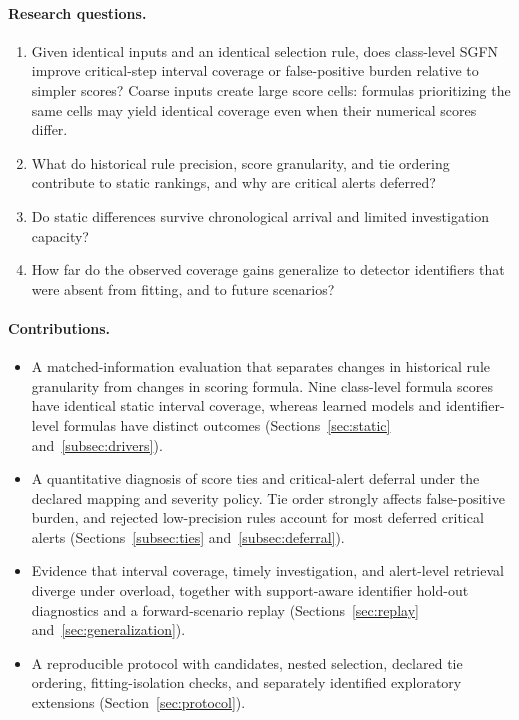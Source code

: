 \documentclass[pdflatex,sn-basic,Numbered]{sn-jnl}
\begin{document}
\paragraph{Research questions.}
\begin{enumerate}[label=RQ\arabic*,leftmargin=*]
\item Given identical inputs and an identical selection rule, does class-level SGFN improve critical-step interval coverage or false-positive burden relative to simpler scores? Coarse inputs create large score cells: formulas prioritizing the same cells may yield identical coverage even when their numerical scores differ.
\item What do historical rule precision, score granularity, and tie ordering contribute to static rankings, and why are critical alerts deferred?
\item Do static differences survive chronological arrival and limited investigation capacity?
\item How far do the observed coverage gains generalize to detector identifiers that were absent from fitting, and to future scenarios?
\end{enumerate}

\paragraph{Contributions.}
\begin{itemize}[leftmargin=*]
\item A matched-information evaluation that separates changes in historical rule granularity from changes in scoring formula. Nine class-level formula scores have identical static interval coverage, whereas learned models and identifier-level formulas have distinct outcomes (Sections~\ref{sec:static} and~\ref{subsec:drivers}).
\item A quantitative diagnosis of score ties and critical-alert deferral under the declared mapping and severity policy. Tie order strongly affects false-positive burden, and rejected low-precision rules account for most deferred critical alerts (Sections~\ref{subsec:ties} and~\ref{subsec:deferral}).
\item Evidence that interval coverage, timely investigation, and alert-level retrieval diverge under overload, together with support-aware identifier hold-out diagnostics and a forward-scenario replay (Sections~\ref{sec:replay} and~\ref{sec:generalization}).
\item A reproducible protocol with \NCandidates{} candidates, nested selection, declared tie ordering, fitting-isolation checks, and separately identified exploratory extensions (Section~\ref{sec:protocol}).
\end{itemize}
\end{document}
